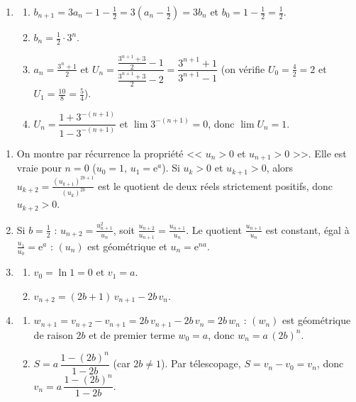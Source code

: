 \begin{corrige}
\begin{sol}
\begin{enumerate}
\item \begin{enumerate}
      \item $b_{n+1} = 3a_n - 1 - \frac{1}{2} = 3\left(a_n - \frac{1}{2}\right) = 3 b_n$ et $b_0 = 1 - \frac{1}{2} = \frac{1}{2}$.
      \item $b_n = \frac{1}{2} \cdot 3^n$.
      \item $a_n = \frac{3^n + 1}{2}$ et $U_n = \dfrac{\frac{3^{n+1} + 3}{2} - 1}{\frac{3^{n+1} + 3}{2} - 2} = \dfrac{3^{n+1} + 1}{3^{n+1} - 1}$
            (on v\'erifie $U_0 = \frac{4}{2} = 2$ et $U_1 = \frac{10}{8} = \frac{5}{4}$).
      \item $U_n = \dfrac{1 + 3^{-(n+1)}}{1 - 3^{-(n+1)}}$ et $\lim 3^{-(n+1)} = 0$, donc $\lim U_n = 1$.
      \end{enumerate}
\end{enumerate}
\end{sol}
%
\begin{sol}
\begin{enumerate}
\item On montre par r\'ecurrence la propri\'et\'e << $u_n > 0$ et $u_{n+1} > 0$ >>. Elle est vraie pour $n = 0$ ($u_0 = 1$, $u_1 = \mathrm{e}^a$).
      Si $u_k > 0$ et $u_{k+1} > 0$, alors $u_{k+2} = \frac{(u_{k+1})^{2b+1}}{(u_k)^{2b}}$ est le quotient de deux r\'eels strictement positifs, donc $u_{k+2} > 0$.
\item Si $b = \frac{1}{2}$ : $u_{n+2} = \frac{u_{n+1}^2}{u_n}$, soit $\frac{u_{n+2}}{u_{n+1}} = \frac{u_{n+1}}{u_n}$.
      Le quotient $\frac{u_{n+1}}{u_n}$ est constant, \'egal \`a $\frac{u_1}{u_0} = \mathrm{e}^a$ : $(u_n)$ est g\'eom\'etrique et $u_n = \mathrm{e}^{na}$.
\item \begin{enumerate}
      \item $v_0 = \ln 1 = 0$ et $v_1 = a$.
      \item $v_{n+2} = (2b + 1)\, v_{n+1} - 2b\, v_n$.
      \end{enumerate}
\item \begin{enumerate}
      \item $w_{n+1} = v_{n+2} - v_{n+1} = 2b\, v_{n+1} - 2b\, v_n = 2b\, w_n$ : $(w_n)$ est g\'eom\'etrique de raison $2b$ et de premier terme $w_0 = a$,
            donc $w_n = a\,(2b)^n$.
      \item $S = a\, \dfrac{1 - (2b)^n}{1 - 2b}$ (car $2b \neq 1$). Par t\'elescopage, $S = v_n - v_0 = v_n$, donc
            $v_n = a\, \dfrac{1 - (2b)^n}{1 - 2b}$.

\end{enumerate}
\end{enumerate}
\end{sol}
\end{corrige}
